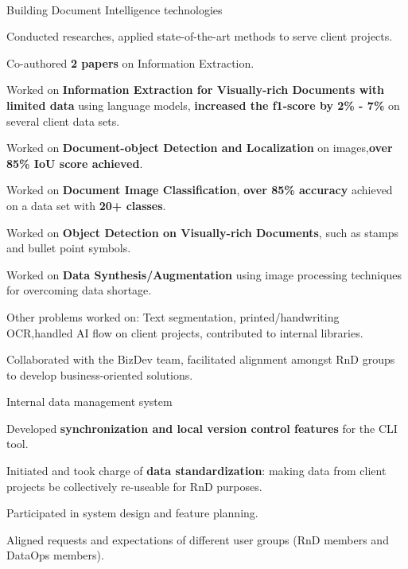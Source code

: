 \\
\begin{xitemize}
    \item Building Document Intelligence technologies
    \begin{zitemize}
        \item Conducted researches, applied state-of-the-art methods to serve client projects.
        \item Co-authored \textbf{2 papers} on Information Extraction.
        \item Worked on \textbf{Information Extraction for Visually-rich Documents with limited data} using language models, \textbf{increased the f1-score by 2\%  - 7\%} on several client data sets.
        \item Worked on \textbf{Document-object Detection and Localization} on images,\textbf{over 85\% IoU score achieved}.
        \item Worked on \textbf{Document Image Classification}, \textbf{over 85\% accuracy} achieved on a data set with \textbf{20+ classes}.
        \item Worked on \textbf{Object Detection on Visually-rich Documents}, such as stamps and bullet point symbols.
        \item Worked on \textbf{Data Synthesis/Augmentation} using image processing techniques for overcoming data shortage.
        \item Other problems worked on: Text segmentation, printed/handwriting OCR,handled AI flow on client projects, contributed to internal libraries.
        \item Collaborated with the BizDev team, facilitated alignment amongst RnD groups to develop business-oriented solutions.
    \end{zitemize}
    \item Internal data management system
    \begin{zitemize}
        \item Developed \textbf{synchronization and local version control features} for the CLI tool.
        \item Initiated and took charge of \textbf{data standardization}: making data from client projects be collectively re-useable for RnD purposes.
        \item Participated in system design and feature planning.
        \item Aligned requests and expectations of different user groups (RnD members and DataOps members).

\end{zitemize}
\end{xitemize}
